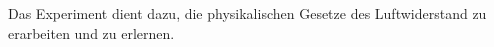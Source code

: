 Das Experiment dient dazu, die physikalischen Gesetze des Luftwiderstand zu erarbeiten und zu erlernen. 
